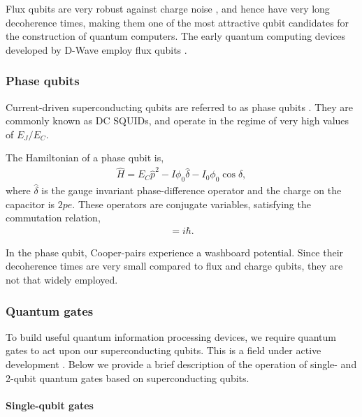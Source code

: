 Flux qubits are very robust against charge noise \cite{bib:you2005fast}, and hence have very long decoherence times, making them one of the most attractive qubit candidates for the construction of quantum computers. The early quantum computing devices developed by D-Wave employ flux qubits \cite{bib:harris2018phase}.

\subsubsection{Phase qubits}

Current-driven superconducting qubits are referred to as phase qubits \cite{bib:martinis2002rabi}. They are commonly known as DC SQUIDs, and operate in the regime of very high values of $E_{J}/E_{C}$.

The Hamiltonian of a phase qubit is,
\begin{align}
\hat{H} = E_{C} \hat{p}^{2} - I \phi_{0} \hat\delta - I_{0} \phi_{0} \cos \hat\delta,
\label{eq:phase_qubit_hamiltonian}
\end{align}
where $\hat\delta$ is the gauge invariant phase-difference operator and the charge on the capacitor is $2pe$. These operators are conjugate variables, satisfying the commutation relation,
\begin{align}
	[\hat\delta, \hat{p}] = i \hbar.
\end{align}

In the phase qubit, Cooper-pairs experience a washboard potential. Since their decoherence times are very small compared to flux and charge qubits, they are not that widely employed.

\subsubsection{Quantum gates}

To build useful quantum information processing devices, we require quantum gates to act upon our superconducting qubits. This is a field under active development \cite{bib:blais2004cavity, bib:chow2011simple, bib:chow2013microwave}. Below we provide a brief description of the operation of single- and 2-qubit quantum gates based on superconducting qubits.

\paragraph{Single-qubit gates}


